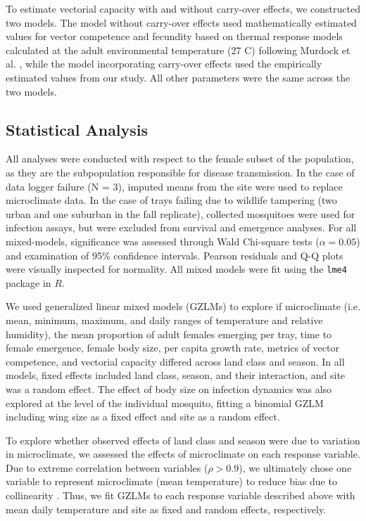 \documentclass{bmcart}
\begin{document}
To estimate vectorial capacity with and without carry-over effects, we constructed two models.
The model without carry-over effects used mathematically estimated values for vector competence and fecundity based on thermal response models calculated at the adult environmental temperature (27 \degree C) following Murdock et al. \citep{mordecai2017}, while the model incorporating carry-over effects used the empirically estimated values from our study.
All other parameters were the same across the two models.

\subsection*{Statistical Analysis}

All analyses were conducted with respect to the female subset of the population, as they are the subpopulation responsible for disease transmission.
In the case of data logger failure (N = 3), imputed means from the site were used to replace microclimate data.
In the case of trays failing due to wildlife tampering (two urban and one suburban in the fall replicate), collected mosquitoes were used for infection assays, but were excluded from survival and emergence analyses.
For all mixed-models, significance was assessed through Wald Chi-square tests ($\alpha=0.05$) and examination of 95\% confidence intervals.
Pearson residuals and Q-Q plots were visually inspected for normality.
All mixed models were fit using the \texttt{lme4} package in $R$.

We used generalized linear mixed models (GZLMs) to explore if microclimate (i.e. mean, minimum, maximum, and daily ranges of temperature and relative humidity), the mean proportion of adult females emerging per tray, time to female emergence, female body size, per capita growth rate, metrics of vector competence, and vectorial capacity differed across land class and season.
In all models, fixed effects included land class, season, and their interaction, and site was a random effect.
The effect of body size on infection dynamics was also explored at the level of the individual mosquito, fitting a binomial GZLM including wing size as a fixed effect and site as a random effect.

To explore whether observed effects of land class and season were due to variation in microclimate, we assessed the effects of microclimate on each response variable.
Due to extreme correlation between variables ($\rho>0.9$), we ultimately chose one variable to represent microclimate (mean temperature) to reduce bias due to collinearity \citep{graham2003}.
Thus, we fit GZLMs to each response variable described above with mean daily temperature and site as fixed and random effects, respectively.
\end{document}
